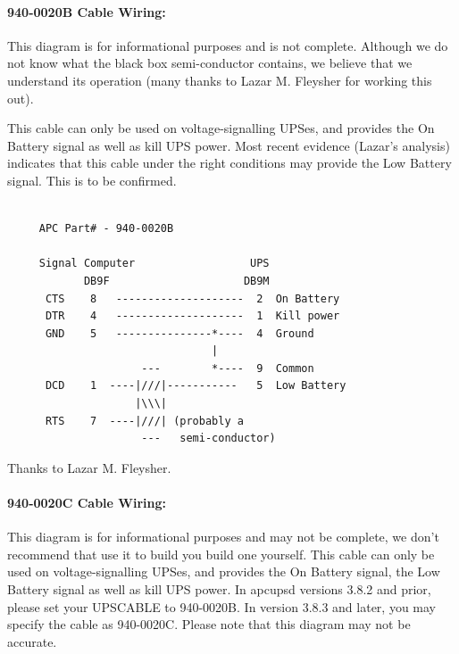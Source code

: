 {{{{{{{{{{\label{index-Cables-202}

\label{940_002d0020B-Cable-Wiring}

\paragraph*{940-0020B Cable Wiring:}

\label{index-Cables-203}
This diagram is for informational purposes and is not complete. Although we do
not know what the black box semi-conductor contains, we believe that we
understand its operation (many thanks to Lazar M. Fleysher for working this
out).  

This cable can only be used on voltage-signalling UPSes, and provides the On
Battery signal as well as kill UPS power. Most recent evidence (Lazar's
analysis) indicates that this cable under the right conditions may provide the
Low Battery signal. This is to be confirmed. 

\footnotesize
\begin{verbatim}
     
     APC Part# - 940-0020B
     
     Signal Computer                  UPS
            DB9F                     DB9M
      CTS    8   --------------------  2  On Battery
      DTR    4   --------------------  1  Kill power
      GND    5   ---------------*----  4  Ground
                                |
                     ---        *----  9  Common
      DCD    1  ----|///|-----------   5  Low Battery
                    |\\\|
      RTS    7  ----|///| (probably a
                     ---   semi-conductor)
\end{verbatim}
\normalsize

Thanks to Lazar M. Fleysher. 

\label{940_002d0020C-Cable-Wiring}

\paragraph*{940-0020C Cable Wiring:}

\label{index-Cables-204}
This diagram is for informational purposes and may not be complete, we don't
recommend that use it to build you build one yourself.  This cable can only be
used on voltage-signalling UPSes, and provides the On Battery signal, the Low
Battery signal as well as kill UPS power. In apcupsd versions 3.8.2 and prior,
please set your UPSCABLE to 940-0020B. In version 3.8.3 and later, you may
specify the cable as 940-0020C. Please note that this diagram may not be
accurate. 

}}}}}}}}}}
